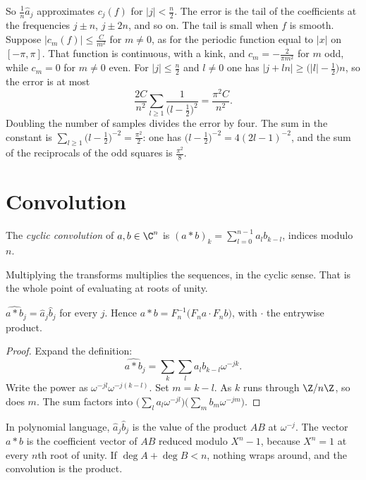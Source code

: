 So $\frac1n\hat a_j$ approximates $c_j(f)$ for $|j|<\frac n2$. The error is the tail of the coefficients at the frequencies $j\pm n$, $j\pm2n$, and so on. The tail is small when $f$ is smooth. Suppose $|c_m(f)|\le\frac C{m^2}$ for $m\ne0$, as for the periodic function equal to $|x|$ on $[-\pi,\pi]$. That function is continuous, with a kink, and $c_m=-\frac2{\pi m^2}$ for $m$ odd, while $c_m=0$ for $m\ne0$ even. For $|j|\le\frac n2$ and $l\ne0$ one has $|j+ln|\ge\bigl(|l|-\frac12\bigr)n$, so the error is at most
\[
\frac{2C}{n^2}\sum_{l\ge1}\frac1{\bigl(l-\frac12\bigr)^2}=\frac{\pi^2 C}{n^2}.
\]
Doubling the number of samples divides the error by four. The sum in the constant is $\sum_{l\ge1}\bigl(l-\frac12\bigr)^{-2}=\frac{\pi^2}2$: one has $\bigl(l-\frac12\bigr)^{-2}=4(2l-1)^{-2}$, and the sum of the reciprocals of the odd squares is $\frac{\pi^2}8$.

\section{Convolution}

\begin{definition}
The \emph{cyclic convolution} of $a,b\in\C^n$ is $(a*b)_k=\sum_{l=0}^{n-1}a_lb_{k-l}$, indices modulo $n$.
\end{definition}

Multiplying the transforms multiplies the sequences, in the cyclic sense. That is the whole point of evaluating at roots of unity.

\begin{theorem}\label{thm:convolution}
$\widehat{a*b}_j=\hat a_j\hat b_j$ for every $j$. Hence $a*b=F_n^{-1}\bigl(F_na\cdot F_nb\bigr)$, with $\cdot$ the entrywise product.
\end{theorem}
\begin{proof}
Expand the definition:
\[
\widehat{a*b}_j=\sum_k\sum_l a_l b_{k-l}\omega^{-jk}.
\]
Write the power as $\omega^{-jl}\omega^{-j(k-l)}$. Set $m=k-l$. As $k$ runs through $\Z/n\Z$, so does $m$. The sum factors into $\bigl(\sum_l a_l\omega^{-jl}\bigr)\bigl(\sum_m b_m\omega^{-jm}\bigr)$.
\end{proof}

In polynomial language, $\hat a_j\hat b_j$ is the value of the product $AB$ at $\omega^{-j}$. The vector $a*b$ is the coefficient vector of $AB$ reduced modulo $X^n-1$, because $X^n=1$ at every $n$th root of unity. If $\deg A+\deg B<n$, nothing wraps around, and the convolution is the product.


